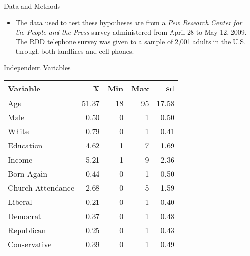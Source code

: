 \documentclass{beamer}
\begin{document}
\begin{frame}{Data and Methods}
  \begin{itemize}
  \item The data used to test these hypotheses are from a \textit{Pew
      Research Center for the People and the Press} survey
    administered from April 28 to May 12, 2009. The RDD telephone
    survey was given to a sample of 2,001 adults in the U.S. through
    both landlines and cell phones.   
  \end{itemize}  
\end{frame}

\begin{frame}{Independent Variables}

\begin{center}
{
\begin{tabular}{lrrrr}
 \textbf{Variable} & $\mathbf{\bar{X}}$ & \textbf{Min} & \textbf{Max} & $\mathbf{sd}$ \\ 
  \hline
Age & 51.37 & 18 & 95 & 17.58 \\ 
  Male &  0.50 &  0 &  1 &  0.50 \\ 
  White &  0.79 &  0 &  1 &  0.41 \\ 
  Education &  4.62 &  1 &  7 &  1.69 \\ 
  Income &  5.21 &  1 &  9 &  2.36 \\ 
  Born Again &  0.44 &  0 &  1 &  0.50 \\ 
  Church Attendance &  2.68 &  0 &  5 &  1.59 \\ 
  Liberal &  0.21 &  0 &  1 &  0.40 \\ 
  Democrat &  0.37 &  0 &  1 &  0.48 \\ 
  Republican &  0.25 &  0 &  1 &  0.43 \\ 
  Conservative &  0.39 &  0 &  1 &  0.49 \\
\hline 
  \end{tabular}
}  
\end{center}
\end{frame}
\end{document}
